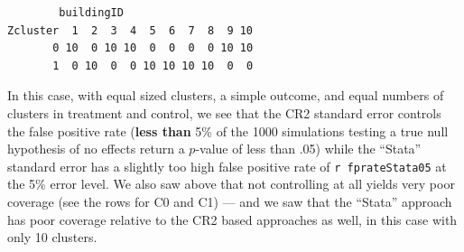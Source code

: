 \documentclass[
  12pt,
]{book}
\newenvironment{Shaded}{\begin{snugshade}}{\end{snugshade}}
\newcommand{\CommentTok}[1]{\textcolor[rgb]{0.56,0.35,0.01}{\textit{#1}}}
\newcommand{\ControlFlowTok}[1]{\textcolor[rgb]{0.13,0.29,0.53}{\textbf{#1}}}
\newcommand{\DataTypeTok}[1]{\textcolor[rgb]{0.13,0.29,0.53}{#1}}
\newcommand{\DecValTok}[1]{\textcolor[rgb]{0.00,0.00,0.81}{#1}}
\newcommand{\FloatTok}[1]{\textcolor[rgb]{0.00,0.00,0.81}{#1}}
\newcommand{\KeywordTok}[1]{\textcolor[rgb]{0.13,0.29,0.53}{\textbf{#1}}}
\newcommand{\NormalTok}[1]{#1}
\newcommand{\OperatorTok}[1]{\textcolor[rgb]{0.81,0.36,0.00}{\textbf{#1}}}
\newcommand{\StringTok}[1]{\textcolor[rgb]{0.31,0.60,0.02}{#1}}
\theoremstyle{definition}
\theoremstyle{definition}
\theoremstyle{definition}
\theoremstyle{remark}
\begin{document}
\begin{verbatim}
        buildingID
Zcluster  1  2  3  4  5  6  7  8  9 10
       0 10  0 10 10  0  0  0  0 10 10
       1  0 10  0  0 10 10 10 10  0  0
\end{verbatim}

In this case, with equal sized clusters, a simple outcome, and equal
numbers of clusters in treatment and control, we see that the CR2
standard error controls the false positive rate (\textbf{less than} 5\%
of the 1000 simulations testing a true null hypothesis of no effects
return a \(p\)-value of less than .05) while the ``Stata'' standard
error has a slightly too high false positive rate of
\texttt{r\ fprateStata05} at the 5\% error level. We also saw above that
not controlling at all yields very poor coverage (see the rows for C0
and C1) --- and we saw that the ``Stata'' approach has poor coverage
relative to the CR2 based approaches as well, in this case with only 10
clusters.

\begin{Shaded}
\end{Shaded}
\end{document}
